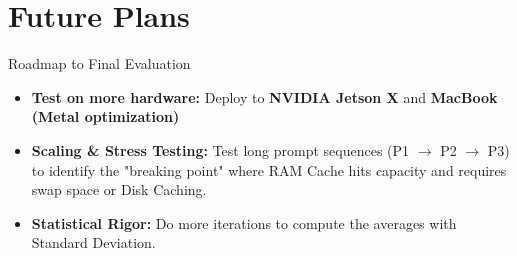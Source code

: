 \documentclass[10pt]{beamer}
\begin{document}
\section{Future Plans}

\begin{frame}{Roadmap to Final Evaluation}
    \begin{itemize}
        \item \textbf{Test on more hardware:} Deploy to \textbf{NVIDIA Jetson X} and \textbf{MacBook (Metal optimization)}
        \item \textbf{Scaling \& Stress Testing:} Test long prompt sequences (P1 $\to$ P2 $\to$ P3) to identify the "breaking point" where RAM Cache hits capacity and requires swap space or Disk Caching.
        \item \textbf{Statistical Rigor:} Do more iterations to compute the averages with Standard Deviation.
    \end{itemize}
\end{frame}
\end{document}
